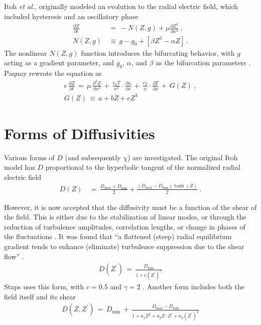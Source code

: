 Itoh \emph{et al.}, originally modeled an evolution to the radial electric field, which included hysteresis and an oscillatory phase \cite{itoh_edge_1991}
\begin{align} %
	\frac{\partial Z}{\partial t} \,&=\, -N(Z,g) + \mu \frac{\partial Z^2}{\partial x^2}~,\label{eq:original_z} \\
	N(Z,g) \,&\equiv\, g - g_0 + \left[\beta Z^3 - \alpha Z\right]~.
\end{align}
The nonlinear $N(Z,g)$ function introduces the bifurcating behavior, with $g$ acting as a gradient parameter, and $g_0$, $\alpha$, and $\beta$ as the bifurcation parameters \cite{itoh_model_1988}.
Paquay rewrote the equation as
\begin{align} %
	\epsilon \, \frac{\partial Z}{\partial t} \,=\, \mu \, \frac{\partial^2 Z}{\partial x^2} \,+\, \frac{c_n T}{n^2} \cdot \frac{\partial n}{\partial x} \,+\, \frac{c_T}{n} \cdot \frac{\partial T}{\partial x} \,+\, G(Z)~,\label{eq:paquay_Z} \\
	G(Z) \,\equiv\, a + bZ + cZ^3 \label{eq:G_polynomial}
\end{align}

\section{Forms of Diffusivities}\label{sec:diffusivities}
Various forms of $D$ (and subsequently $\chi$) are investigated.
The original Itoh model has $D$ proportional to the hyperbolic tangent of the normalized radial electric field \cite{itoh_edge_1991} \cite{zohm_dynamic_1994}
\begin{align} %
	D(Z) \,&=\, \frac{D_\text{max} + D_\text{min}}{2} + \frac{(D_\text{max} - D_\text{min})\tanh(Z)}{2}~. \label{eq:Itoh_diffusivity}
\end{align}

However, it is now accepted that the diffusivity must be a function of the shear of the field.
This is either due to the stabilization of linear modes, or through the reduction of turbulence amplitudes, correlation lengths, or change in phases of the fluctuations \cite{connor_review_2000}.
It was found that ``a flattened (steep) radial equilibrium gradient tends to enhance (eliminate) turbulence suppression due to the shear flow'' \cite{zhang_edge_1992}.
\begin{align} %
	D(Z^{\prime}) \,=\, \frac{D_\text{min}}{1 + c(Z^{\prime})^{\gamma}} \label{eq:shear_diffusivity}
\end{align}
Staps uses this form, with $c = 0.5$ and $\gamma = 2$ \cite{staps_backstepping_2017}.
Another form includes both the field itself and its shear \cite{paquay_studying_2012}
\begin{align} %
	D(Z, Z^{\prime}) \,=\, D_\text{min} \,+\, \frac{D_\text{max} - D_\text{min}}{1 + a_1 Z^2 + a_2 Z \cdot Z^{\prime} + a_3 (Z^{\prime})^2} \label{eq:flow-shear}
\end{align}

